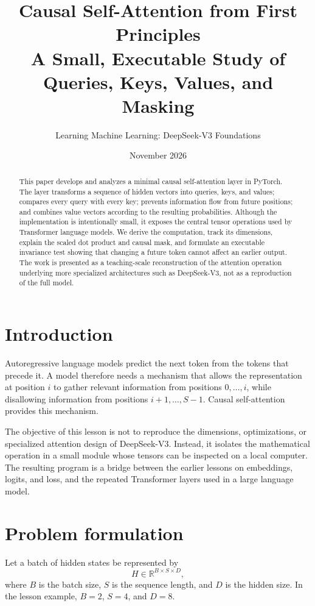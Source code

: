 \documentclass[11pt]{article}
\title{Causal Self-Attention from First Principles\\
\large A Small, Executable Study of Queries, Keys, Values, and Masking}
\author{Learning Machine Learning: DeepSeek-V3 Foundations}
\date{November 2026}
\begin{document}
\maketitle
\begin{abstract}
This paper develops and analyzes a minimal causal self-attention layer in
PyTorch. The layer transforms a sequence of hidden vectors into queries, keys,
and values; compares every query with every key; prevents information flow from
future positions; and combines value vectors according to the resulting
probabilities. Although the implementation is intentionally small, it exposes
the central tensor operations used by Transformer language models. We derive
the computation, track its dimensions, explain the scaled dot product and
causal mask, and formulate an executable invariance test showing that changing
a future token cannot affect an earlier output. The work is presented as a
teaching-scale reconstruction of the attention operation underlying more
specialized architectures such as DeepSeek-V3, not as a reproduction of the
full model.
\end{abstract}

\tableofcontents
\newpage

\section{Introduction}
Autoregressive language models predict the next token from the tokens that
precede it. A model therefore needs a mechanism that allows the representation
at position $i$ to gather relevant information from positions $0,\ldots,i$,
while disallowing information from positions $i+1,\ldots,S-1$. Causal
self-attention provides this mechanism.

The objective of this lesson is not to reproduce the dimensions, optimizations,
or specialized attention design of DeepSeek-V3. Instead, it isolates the
mathematical operation in a small module whose tensors can be inspected on a
local computer. The resulting program is a bridge between the earlier lessons
on embeddings, logits, and loss, and the repeated Transformer layers used in a
large language model.

\section{Problem formulation}
Let a batch of hidden states be represented by
\[
H \in \mathbb{R}^{B\times S\times D},
\]
where $B$ is the batch size, $S$ is the sequence length, and $D$ is the hidden
size. In the lesson example, $B=2$, $S=4$, and $D=8$.
\end{document}
